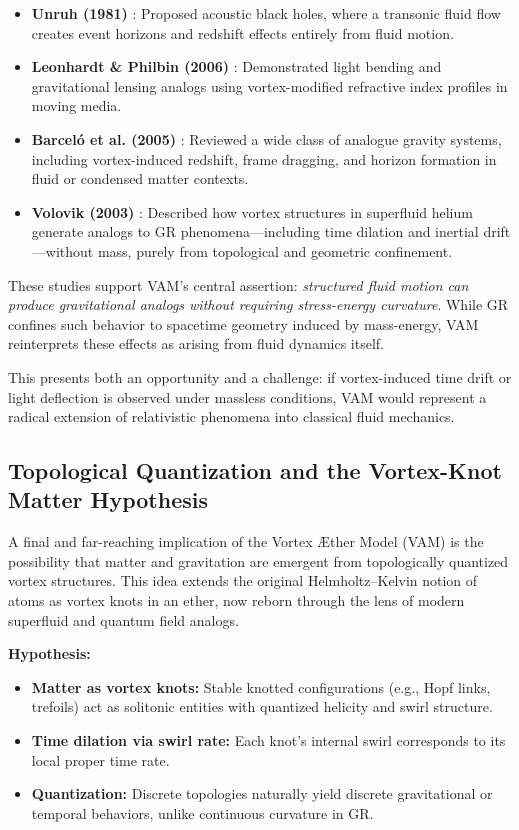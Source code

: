 \begin{itemize}
    \item \textbf{Unruh (1981)} \cite{unruh1981}: Proposed acoustic black holes, where a transonic fluid flow creates event horizons and redshift effects entirely from fluid motion.

    \item \textbf{Leonhardt \& Philbin (2006)} \cite{leonhardt2006}: Demonstrated light bending and gravitational lensing analogs using vortex-modified refractive index profiles in moving media.

    \item \textbf{Barceló et al. (2005)} \cite{barcelo2005}: Reviewed a wide class of analogue gravity systems, including vortex-induced redshift, frame dragging, and horizon formation in fluid or condensed matter contexts.

    \item \textbf{Volovik (2003)} \cite{volovik2003}: Described how vortex structures in superfluid helium generate analogs to GR phenomena---including time dilation and inertial drift---without mass, purely from topological and geometric confinement.
\end{itemize}

These studies support VAM’s central assertion: \emph{structured fluid motion can produce gravitational analogs without requiring stress-energy curvature}. While GR confines such behavior to spacetime geometry induced by mass-energy, VAM reinterprets these effects as arising from fluid dynamics itself.

This presents both an opportunity and a challenge: if vortex-induced time drift or light deflection is observed under massless conditions, VAM would represent a radical extension of relativistic phenomena into classical fluid mechanics.

\subsection{Topological Quantization and the Vortex-Knot Matter Hypothesis}

A final and far-reaching implication of the Vortex Æther Model (VAM) is the possibility that matter and gravitation are emergent from topologically quantized vortex structures. This idea extends the original Helmholtz–Kelvin notion of atoms as vortex knots in an ether, now reborn through the lens of modern superfluid and quantum field analogs.

\textbf{Hypothesis:}
\begin{itemize}
    \item \textbf{Matter as vortex knots:} Stable knotted configurations (e.g., Hopf links, trefoils) act as solitonic entities with quantized helicity and swirl structure.
    \item \textbf{Time dilation via swirl rate:} Each knot's internal swirl corresponds to its local proper time rate.
    \item \textbf{Quantization:} Discrete topologies naturally yield discrete gravitational or temporal behaviors, unlike continuous curvature in GR.
\end{itemize}

